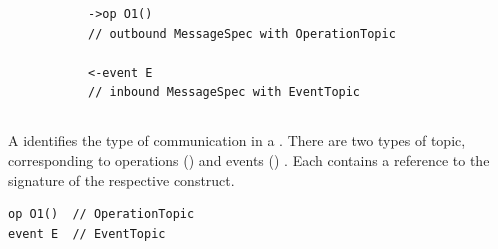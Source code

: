 \begin{figure}[H]

\begin{subfigure}[t]{\egtextwidth}
\begin{lstlisting}[style=Example]
->op O1()
// outbound MessageSpec with OperationTopic

<-event E
// inbound MessageSpec with EventTopic
\end{lstlisting}
\end{subfigure}
\hfill
\begin{subfigure}[t]{\eggraphicalwidth}
\gsecaption
\centering
{}
\end{subfigure}

\end{figure}

\subsection{\mmessagetopic}\label{ssec:metamodel-messages-topics}

A \mmessagetopic{} identifies the type of communication in a
\mmessagespec{}.  There are two types of topic, corresponding to
\robochart{} operations (\moperationtopic) and events (\meventtopic)
.
Each contains a reference to the signature of the respective construct.

\begin{lstlisting}[style=Example]
op O1()  // OperationTopic
event E  // EventTopic
\end{lstlisting}

\subsection{\margument}\label{ssec:metamodel-messages-arguments}

